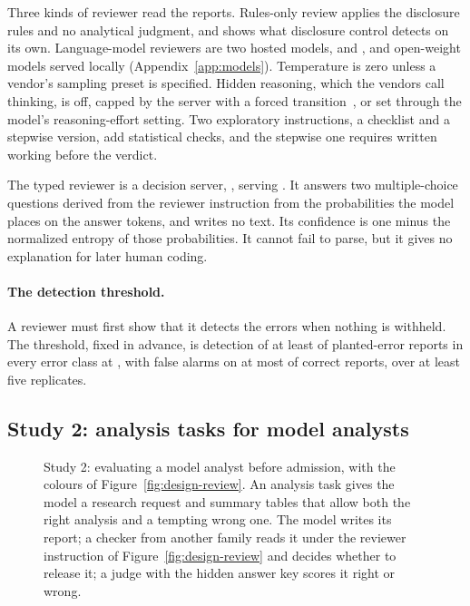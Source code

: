 Three kinds of reviewer read the reports. Rules-only review applies the disclosure rules and no analytical judgment, and shows what disclosure control detects on its own. Language-model reviewers are two hosted models,  and , and open-weight models served locally (Appendix~\ref{app:models}). Temperature is zero unless a vendor's sampling preset is specified. Hidden reasoning, which the vendors call thinking, is off, capped by the server with a forced transition~\cite{wei2022cot}, or set through the model's reasoning-effort setting. Two exploratory instructions, a checklist and a stepwise version, add statistical checks, and the stepwise one requires written working before the verdict.

The typed reviewer is a decision server, , serving . It answers two multiple-choice questions derived from the reviewer instruction from the probabilities the model places on the answer tokens, and writes no text. Its confidence is one minus the normalized entropy of those probabilities. It cannot fail to parse, but it gives no explanation for later human coding.

\paragraph{The detection threshold.}
A reviewer must first show that it detects the errors when nothing is withheld. The threshold, fixed in advance, is detection of at least  of planted-error reports in every error class at , with false alarms on at most  of correct reports, over at least five replicates.

\subsection{Study 2: analysis tasks for model analysts}
\label{sec:methods-harvest}

\begin{figure}[t]
\centering

\caption{Study 2: evaluating a model analyst before admission, with the colours of Figure~\ref{fig:design-review}. An analysis task gives the model a research request and summary tables that allow both the right analysis and a tempting wrong one. The model writes its report; a checker from another family reads it under the reviewer instruction of Figure~\ref{fig:design-review} and decides whether to release it; a judge with the hidden answer key scores it right or wrong.}
\label{fig:design-evaluation}
\end{figure}

